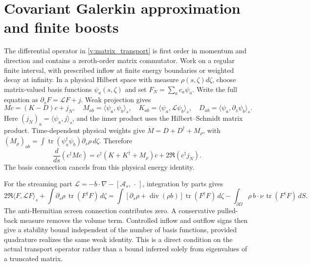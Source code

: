 \section{Covariant Galerkin approximation and finite boosts}
\label{v:galerkin}

The differential operator in \eqref{v:matrix_transport} is first order in momentum and direction and contains a zeroth-order matrix commutator. Work on a regular finite interval, with prescribed inflow at finite energy boundaries or weighted decay at infinity. In a physical Hilbert space with measure $\rho(s,\zeta)d\zeta$, choose matrix-valued basis functions $\psi_a(s,\zeta)$ and set $F_N=\sum_ac_a\psi_a$. Write the full equation as $\partial_sF=\mathcal LF+j$. Weak projection gives
\begin{equation}
 M\dot c=(K-D)c+j_N,\quad
 M_{ab}=\langle\psi_a,\psi_b\rangle_s,\quad
 K_{ab}=\langle\psi_a,\mathcal L\psi_b\rangle_s,\quad
 D_{ab}=\langle\psi_a,\partial_s\psi_b\rangle_s .
 \label{v:galerkin_matrix}
\end{equation}
Here $(j_N)_a=\langle\psi_a,j\rangle_s$, and the inner product uses the Hilbert--Schmidt matrix product. Time-dependent physical weights give
$\dot M=D+D^\dagger+M_\rho$, with
$(M_\rho)_{ab}=\int\operatorname{tr}(\psi_a^\dagger\psi_b)\partial_s\rho\,d\zeta$.
Therefore
\begin{equation}
 \frac{d}{ds}(c^\dagger Mc)=
 c^\dagger(K+K^\dagger+M_\rho)c+
 2\Re(c^\dagger j_N).
 \label{v:galerkin_energy}
\end{equation}
The basis connection cancels from this physical energy identity.

For the streaming part $\mathcal L=-b\cdot\nabla-[\mathcal A_s,\,\cdot\,]$, integration by parts gives
\begin{equation}
 2\Re\langle F,\mathcal LF\rangle_s+
 \int \partial_s\rho\,\operatorname{tr}(F^\dagger F)\,d\zeta
 =
 \int[\partial_s\rho+\operatorname{div}(\rho b)]
 \operatorname{tr}(F^\dagger F)\,d\zeta
 -\int_{\partial\Omega}\rho\,b\cdot\nu\,\operatorname{tr}(F^\dagger F)\,dS .
 \label{v:stream_energy}
\end{equation}
The anti-Hermitian screen connection contributes zero. A conservative pulled-back measure removes the volume term. Controlled inflow and outflow signs then give a stability bound independent of the number of basis functions, provided quadrature realizes the same weak identity. This is a direct condition on the actual transport operator rather than a bound inferred solely from eigenvalues of a truncated matrix.

